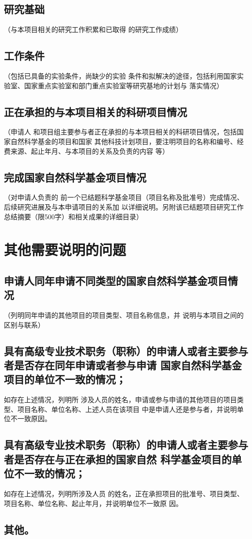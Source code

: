 \documentclass[a4paper,12pt, AutoFakeBold, fontset=adobe]{ctexart}
\begin{document}
\subsection{研究基础}{\color{nsfcblue}\kaishu\noindent（与本项目相关的研究工作积累和已取得
  的研究工作成绩）}

\subsection{工作条件}{\color{nsfcblue}\kaishu\noindent（包括已具备的实验条件，尚缺少的实验
  条件和拟解决的途径，包括利用国家实验室、国家重点实验室和部门重点实验室等研究基地的计划与
  落实情况）}

\subsection{正在承担的与本项目相关的科研项目情况}{\color{nsfcblue}\kaishu\noindent（申请人
  和项目组主要参与者正在承担的与本项目相关的科研项目情况，包括国家自然科学基金的项目和国家
  其他科技计划项目，要注明项目的名称和编号、经费来源、起止年月、与本项目的关系及负责的内容
  等）}

\subsection{完成国家自然科学基金项目情况}{\color{nsfcblue}\kaishu\noindent（对申请人负责的
  前一个已结题科学基金项目（项目名称及批准号）完成情况、后续研究进展及与本申请项目的关系加
  以详细说明。另附该已结题项目研究工作总结摘要（限500字）和相关成果的详细目录）}

\section{其他需要说明的问题}


\subsection{申请人同年申请不同类型的国家自然科学基金项目情
  况}{\color{nsfcblue}\kaishu\noindent（列明同年申请的其他项目的项目类型、项目名称信息，并
  说明与本项目之间的区别与联系）}

\subsection{具有高级专业技术职务（职称）的申请人或者主要参与者是否存在同年申请或者参与申请
  国家自然科学基金项目的单位不一致的情况；}{\color{nsfcblue}\kaishu 如存在上述情况，列明所
  涉及人员的姓名，申请或参与申请的其他项目的项目类型、项目名称、单位名称、上述人员在该项目
  中是申请人还是参与者，并说明单位不一致原因。}

\subsection{具有高级专业技术职务（职称）的申请人或者主要参与者是否存在与正在承担的国家自然
  科学基金项目的单位不一致的情况；}{\color{nsfcblue}\kaishu 如存在上述情况，列明所涉及人员
  的姓名，正在承担项目的批准号、项目类型、项目名称、单位名称、起止年月，并说明单位不一致原
  因。}

\subsection{其他。}
\end{document}
